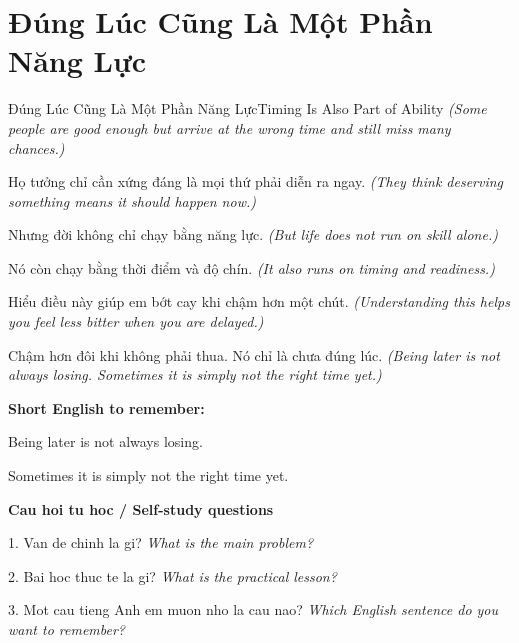 \section{Đúng Lúc Cũng Là Một Phần Năng Lực}
\begin{truyen}{Đúng Lúc Cũng Là Một Phần Năng Lực}{Timing Is Also Part of Ability}
\textit{(Some people are good enough but arrive at the wrong time and still miss many chances.)}

Họ tưởng chỉ cần xứng đáng là mọi thứ phải diễn ra ngay.
\textit{(They think deserving something means it should happen now.)}

Nhưng đời không chỉ chạy bằng năng lực.
\textit{(But life does not run on skill alone.)}

Nó còn chạy bằng thời điểm và độ chín.
\textit{(It also runs on timing and readiness.)}

Hiểu điều này giúp em bớt cay khi chậm hơn một chút.
\textit{(Understanding this helps you feel less bitter when you are delayed.)}

\end{truyen}

\begin{baihoc}
Chậm hơn đôi khi không phải thua. Nó chỉ là chưa đúng lúc.
\textit{(Being later is not always losing. Sometimes it is simply not the right time yet.)}
\end{baihoc}

\begin{ghinhoanh}
\textbf{Short English to remember:}

Being later is not always losing.

Sometimes it is simply not the right time yet.

\end{ghinhoanh}

\begin{tuhocnhanh}
\textbf{Cau hoi tu hoc / Self-study questions}

1. Van de chinh la gi? \textit{What is the main problem?}

2. Bai hoc thuc te la gi? \textit{What is the practical lesson?}

3. Mot cau tieng Anh em muon nho la cau nao? \textit{Which English sentence do you want to remember?}
\end{tuhocnhanh}
\ngancach

